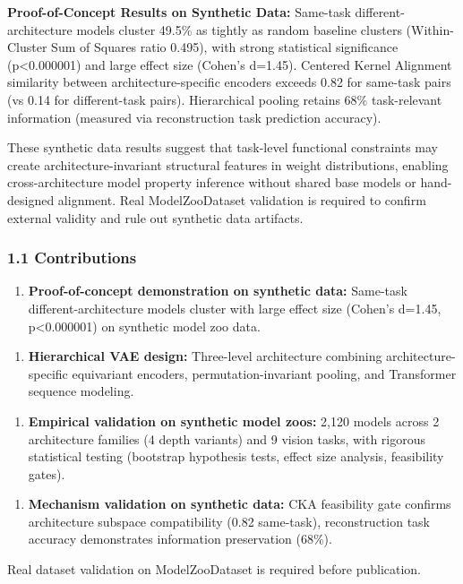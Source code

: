 \textbf{Proof-of-Concept Results on Synthetic Data:} Same-task different-architecture models cluster 49.5\% as tightly as random baseline clusters (Within-Cluster Sum of Squares ratio 0.495), with strong statistical significance (p<0.000001) and large effect size (Cohen's d=1.45). Centered Kernel Alignment similarity between architecture-specific encoders exceeds 0.82 for same-task pairs (vs 0.14 for different-task pairs). Hierarchical pooling retains 68\% task-relevant information (measured via reconstruction task prediction accuracy).

These synthetic data results suggest that task-level functional constraints may create architecture-invariant structural features in weight distributions, enabling cross-architecture model property inference without shared base models or hand-designed alignment. Real ModelZooDataset validation is required to confirm external validity and rule out synthetic data artifacts.

\subsubsection{1.1 Contributions}

\begin{enumerate}
\item \textbf{Proof-of-concept demonstration on synthetic data:} Same-task different-architecture models cluster with large effect size (Cohen's d=1.45, p<0.000001) on synthetic model zoo data.
\end{enumerate}

\begin{enumerate}
\item \textbf{Hierarchical VAE design:} Three-level architecture combining architecture-specific equivariant encoders, permutation-invariant pooling, and Transformer sequence modeling.
\end{enumerate}

\begin{enumerate}
\item \textbf{Empirical validation on synthetic model zoos:} 2,120 models across 2 architecture families (4 depth variants) and 9 vision tasks, with rigorous statistical testing (bootstrap hypothesis tests, effect size analysis, feasibility gates).
\end{enumerate}

\begin{enumerate}
\item \textbf{Mechanism validation on synthetic data:} CKA feasibility gate confirms architecture subspace compatibility (0.82 same-task), reconstruction task accuracy demonstrates information preservation (68\%).
\end{enumerate}

Real dataset validation on ModelZooDataset is required before publication.


